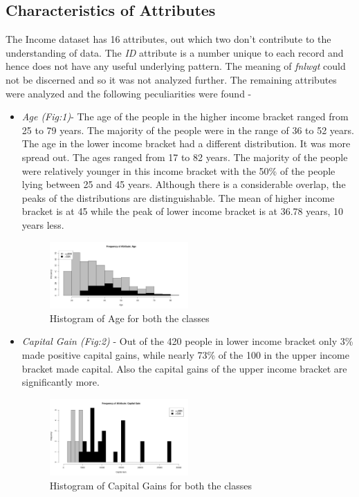 \subsection{Characteristics of Attributes}
The Income dataset has 16 attributes, out which two don't contribute to the understanding of data. The \emph{ID} attribute is a number unique to each record and hence does not have any useful underlying pattern. The meaning of \emph{fnlwgt} could not be discerned and so it was not analyzed further. The remaining attributes were analyzed and the following peculiarities were found - 
\begin{itemize}
	\item \emph{Age (Fig:1)}- The age of the people in the higher income bracket ranged from 25 to 79 years. The majority of the people were in the range of 36 to 52 years. The age in the lower income bracket had a different distribution. It was more spread out. The ages ranged from 17 to 82 years. The majority of the people were relatively younger in this income bracket with the 50\% of the people lying between 25 and 45 years. Although there is a considerable overlap, the peaks of the distributions are distinguishable. The mean of higher income bracket is at 45 while the peak of lower income bracket is at 36.78 years, 10 years less.
		\begin{figure}[h]
			\label{fig:age-hist}
			\caption{Histogram of Age for both the classes}
			\centering
			\includegraphics[width=0.5\textwidth]{images/age-hist.jpg}
		\end{figure}
	\item \emph{Capital Gain (Fig:2)} - Out of the 420 people in lower income bracket only 3\% made positive capital gains, while nearly 73\% of the 100 in the upper income bracket made capital. Also the capital gains of the upper income bracket are significantly more.
		\begin{figure}[h]
			\label{fig:capital-gain-hist}
			\caption{Histogram of Capital Gains for both the classes}
			\centering
			\includegraphics[width=0.5\textwidth]{images/capital_gain-hist.jpg}

\end{figure}
\end{itemize}

